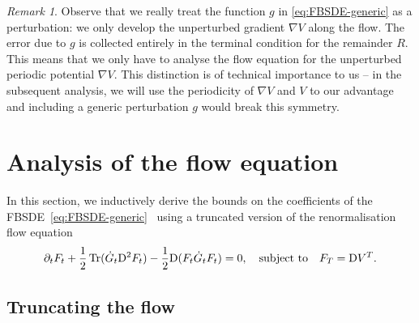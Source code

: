 \documentclass[11pt, a4paper]{scrartcl}
\numberwithin{equation}{section}
\theoremstyle{plain}
\theoremstyle{remark}
\newtheorem{remark}[foo]{Remark}
\newcommand{\mathD}{\mathrm{D}}
\newcommand{\tmop}[1]{\ensuremath{\operatorname{#1}}}
\begin{document}
\begin{remark}
	Observe that we really treat the function $g$ in \eqref{eq:FBSDE-generic} as
	a perturbation: we only develop the unperturbed gradient $\nabla V$ along
	the flow. The error due to $g$ is collected entirely in the terminal
	condition for the remainder $R$. This means that we only have to analyse the
	flow equation for the unperturbed periodic potential $\nabla V$.
	This distinction is of technical importance to us -- in the subsequent analysis, we will use the periodicity of $\nabla V$ and $V$ to our advantage
	and including a generic perturbation $g$ would break this symmetry.
\end{remark}

\section{Analysis of the flow equation}\label{sec:flow-eq}

In this section, we inductively derive the bounds on the coefficients of the
FBSDE~\eqref{eq:FBSDE-generic} \ using a truncated version of the
renormalisation flow equation
\begin{equation}
	\partial_t F_t + \frac{1}{2} \tmop{Tr} (\dot{G}_t \mathD^2 F_t) -
	\frac{1}{2} \mathD (F_t  \dot{G}_t F_t) = 0 \label{eq:F-flow}, \quad
	\text{subject to\quad} F_T = \mathD V^T .
\end{equation}
\subsection{Truncating the
	flow}\label{rem:relevant-terms-b-leq-4}\label{sec:truncated-flow}
\end{document}
